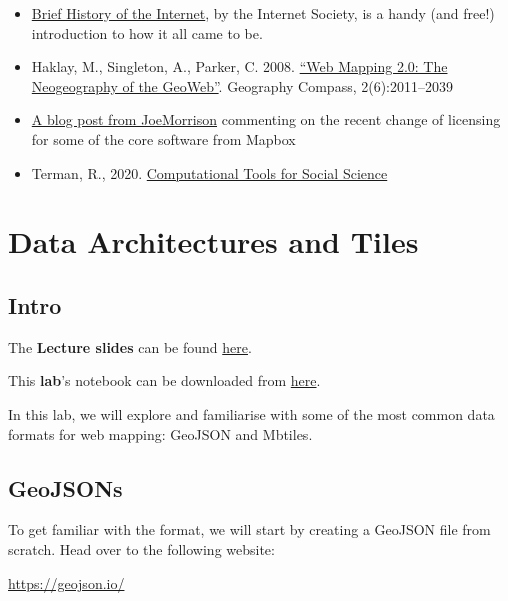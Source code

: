 \documentclass[
  letterpaper,
  DIV=11,
  numbers=noendperiod]{scrreprt}
\providecommand{\tightlist}{%
  \setlength{\itemsep}{0pt}\setlength{\parskip}{0pt}}\usepackage{longtable,booktabs,array}
\begin{document}
\begin{itemize}
\tightlist
\item
  \href{https://www.internetsociety.org/resources/doc/2017/brief-history-internet/}{Brief
  History of the Internet}, by the Internet Society, is a handy (and
  free!) introduction to how it all came to be.
\item
  Haklay, M., Singleton, A., Parker, C. 2008.
  \href{https://compass.onlinelibrary.wiley.com/doi/abs/10.1111/j.1749-8198.2008.00167.x}{``Web
  Mapping 2.0: The Neogeography of the GeoWeb''}. Geography Compass,
  2(6):2011--2039
\item
  \href{https://joemorrison.medium.com/death-of-an-open-source-business-model-62bc227a7e9b}{A
  blog post from JoeMorrison} commenting on the recent change of
  licensing for some of the core software from Mapbox
\item
  Terman, R., 2020.
  \href{https://plsc-31101.github.io/course/}{Computational Tools for
  Social Science}
\end{itemize}


\chapter{Data Architectures and
Tiles}\label{data-architectures-and-tiles}

\section{Intro}\label{intro}

The \textbf{Lecture slides} can be found
\href{https://github.com/GDSL-UL/wma/raw/main/lectures/w04.pdf}{here}.

This \textbf{lab}'s notebook can be downloaded from
\href{https://github.com/GDSL-UL/wma/blob/main/labs/w04_dataArch.ipynb}{here}.

In this lab, we will explore and familiarise with some of the most
common data formats for web mapping: GeoJSON and Mbtiles.

\section{GeoJSONs}\label{geojsons}

To get familiar with the format, we will start by creating a GeoJSON
file from scratch. Head over to the following website:

\url{https://geojson.io/}
\end{document}

